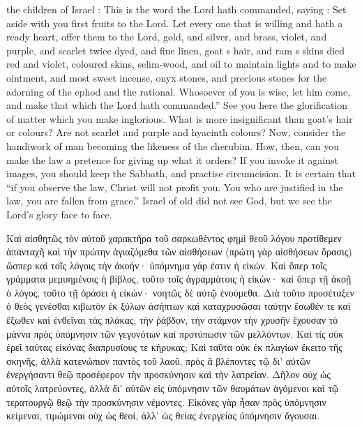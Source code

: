 \documentclass[10pt]{book}
\newcommand{\switchgreek}[1][]{\selectlanguage{polutonikogreek} \switchcolumn*[#1]}
\newcommand{\switchenglish}{\selectlanguage{english} \switchcolumn}
\begin{document}
\begin{paracol}{2}
the children of Israel : This is the word the 
Lord hath commanded, saying : Set aside with 
you first fruits to the Lord. Let every one 
that is willing and hath a ready heart, offer 
them to the Lord, gold, and silver, and brass, 
violet, and purple, and scarlet twice dyed, and 
fine linen, goat s hair, and ram s skins died red 
and violet, coloured skins, selim-wood, and oil 
to maintain lights and to make ointment, and 
most sweet incense, onyx stones, and precious 
stones for the adorning of the ephod and the 
rational. Whosoever of you is wise, let him 
come, and make that which the Lord hath 
commanded.'' See you here the glorification 
of matter which you make inglorious. What 
is more insignificant than goat's hair or colours? 
Are not scarlet and purple and hyacinth colours? 
Now, consider the handiwork of man becoming 
the likeness of the cherubim. How, then, can 
you make the law a pretence for giving up 
what it orders? If you invoke it against 
images, you should keep the Sabbath, and 
practise circumcision. It is certain that ``if 
you observe the law, Christ will not profit 
you. You who are justified in the law, you 
are fallen from grace.'' Israel of old did not see 
God, but we see the Lord's glory face to face. 

\switchgreek

Καὶ αἰσθητῶς τὸν αὐτοῦ χαρακτῆρα τοῦ σαρκωθέντος φημὶ θεοῦ λόγου προτίθεμεν ἁπανταχῆ καὶ τὴν πρώτην ἁγιαζόμεθα τῶν αἰσθήσεων (πρώτη γὰρ αἰσθήσεων ὅρασις) ὥσπερ καὶ τοῖς λόγοις τὴν ἀκοήν· ὑπόμνημα γάρ ἐστιν ἡ εἰκών. Καὶ ὅπερ τοῖς γράμματα μεμυημένοις ἡ βίβλος, τοῦτο τοῖς ἀγραμμάτοις ἡ εἰκών· καὶ ὅπερ τῇ ἀκοῇ ὁ λόγος, τοῦτο τῇ ὁράσει ἡ εἰκών· νοητῶς δὲ αὐτῷ ἑνούμεθα. Διὰ τοῦτο προσέταξεν ὁ θεὸς γενέσθαι κιβωτὸν ἐκ ξύλων ἀσήπτων καὶ καταχρυσῶσαι ταύτην ἔσωθέν τε καὶ ἔξωθεν καὶ ἐνθεῖναι τὰς πλάκας, τὴν ῥάβδον, τὴν στάμνον τὴν χρυσῆν ἔχουσαν τὸ μάννα πρὸς ὑπόμνησιν τῶν γεγονότων καὶ προτύπωσιν τῶν μελλόντων. Καὶ τίς οὐκ ἐρεῖ ταύτας εἰκόνας διαπρυσίους τε κήρυκας; Καὶ ταῦτα οὐκ ἐκ πλαγίων ἔκειτο τῆς σκηνῆς, ἀλλὰ κατενώπιον παντὸς τοῦ λαοῦ, πρὸς ἃ βλέποντες τῷ δι’ αὐτῶν ἐνεργήσαντι θεῷ προσέφερον τὴν προσκύνησιν καὶ τὴν λατρείαν. Δῆλον οὐχ ὡς αὐτοῖς λατρεύοντες, ἀλλὰ δι’ αὐτῶν εἰς ὑπόμνησιν τῶν θαυμάτων ἀγόμενοι καὶ τῷ τερατουργῷ θεῷ τὴν προσκύνησιν νέμοντες. Εἰκόνες γὰρ ἦσαν πρὸς ὑπόμνησιν κείμεναι, τιμώμεναι οὐχ ὡς θεοί, ἀλλ’ ὡς θείας ἐνεργείας ὑπόμνησιν ἄγουσαι.

\switchenglish


\end{paracol}
\end{document}
